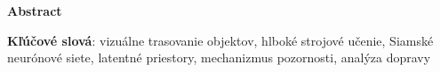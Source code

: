 \thispagestyle{plain}

\begin{center}
    \Large{\textbf{Abstract}}
\end{center}


\noindent \textbf{Kľúčové slová}: vizuálne trasovanie objektov, hlboké strojové učenie, Siamské neurónové siete, latentné priestory, mechanizmus pozornosti, analýza dopravy
